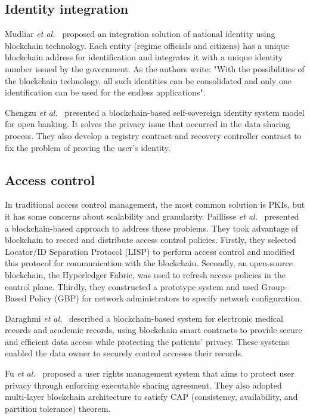 \subsection{Identity integration}
Mudliar \emph{et al.}~\cite{mudliar2018comprehensive} proposed an integration solution of national identity using blockchain technology. Each entity (regime officials and citizens) has a unique blockchain address for identification and integrates it with a unique identity number issued by the government. As the authors write: "With the possibilities of the blockchain technology, all such identities can be consolidated and only one identification can be used for the endless applications".

Chengzu \emph{et al.}~\cite{dong2020bbm} presented a blockchain-based self-sovereign identity system model for open banking. It solves the privacy issue that occurred in the data sharing process. They also develop a registry contract and recovery controller contract to fix the problem of proving the user's identity.

\subsection{Access control}
In traditional access control management, the most common solution is PKIs, but it has some concerns about scalability and granularity. Paillisse \emph{et al.}~\cite{paillisse2019distributed} presented a blockchain-based approach to address these problems. They took advantage of blockchain to record and distribute access control policies. Firstly, they selected Locator/ID Separation Protocol (LISP) to perform access control and modified this protocol for communication with the blockchain. Secondly, an open-source blockchain, the Hyperledger Fabric, was used to refresh access policies in the control plane. Thirdly, they constructed a prototype system and used Group-Based Policy (GBP) for network administrators to specify network configuration.\par

Daraghmi \emph{et al.}~\cite{daraghmi2019medchain,daraghmi2019unichain} described a blockchain-based system for electronic medical records and academic records, using blockchain smart contracts to provide secure and efficient data access while protecting the patients' privacy. These systems enabled the data owner to securely control accesses their records.\par

Fu \emph{et al.}~\cite{fu2020soteria} proposed a user rights management system that aims to protect user privacy through enforcing executable sharing agreement. They also adopted multi-layer blockchain architecture to satisfy CAP (consistency, availability, and partition tolerance) theorem.\par

